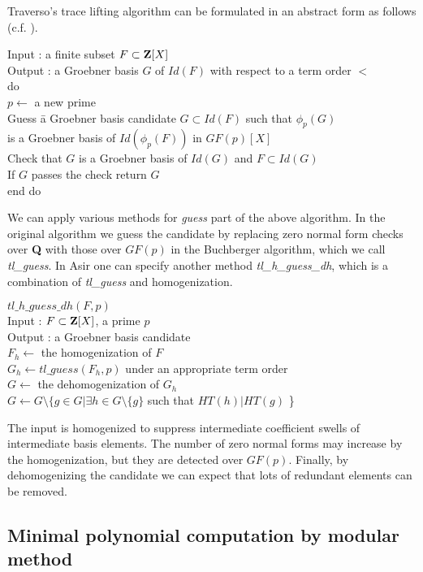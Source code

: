 \documentclass[runningheads]{cl2emult}
\begin{document}
Traverso's trace lifting algorithm can be
formulated in an abstract form as follows (c.f. \cite{FPARA}).
\begin{tabbing}
Input : a finite subset $F \subset {\bf Z}[X]$\\
Output : a Groebner basis $G$ of $Id(F)$ with respect to a term order $<$\\
do \= \\
\> $p \leftarrow$ a new prime\\
\>Guess \= a Groebner basis candidate $G \subset Id(F)$ 
such that $\phi_p(G)$ \\
\>\> is a Groebner basis of $Id(\phi_p(F))$ in ${GF(p)}[X]$\\
\>Check that $G$ is a Groebner basis of $Id(G)$ and $F \subset Id(G)$\\
\>If $G$ passes the check return $G$\\
end do
\end{tabbing}
We can apply various methods for {\it guess} part of the above
algorithm.  In the original algorithm we guess the candidate by
replacing zero normal form checks over {\bf Q} with those over $GF(p)$
in the Buchberger algorithm, which we call {\it tl\_guess}. In Asir
one can specify another method {\it tl\_h\_guess\_dh}, which is a
combination of {\it tl\_guess} and homogenization.
\begin{tabbing}
$tl\_h\_guess\_dh(F,p)$\\
Input : $F\subset {\bf Z}[X]$, a prime $p$\\
Output : a Groebner basis candidate\\
$F_h \leftarrow$ the homogenization of $F$\\
$G_h \leftarrow tl\_guess(F_h,p)$ under an appropriate term order\\
$G \leftarrow$ the dehomogenization of $G_h$\\
$G \leftarrow G \setminus \{g \in G| \exists h \in G \setminus \{g\}$
such that $HT(h)|HT(g)$ \}
\end{tabbing}
The input is homogenized to suppress intermediate coefficient swells
of intermediate basis elements.  The number of zero normal forms may
increase by the homogenization, but they are detected over
$GF(p)$. Finally, by dehomogenizing the candidate we can expect that
lots of redundant elements can be removed.

\subsection{Minimal polynomial computation by modular method}
\end{document}
